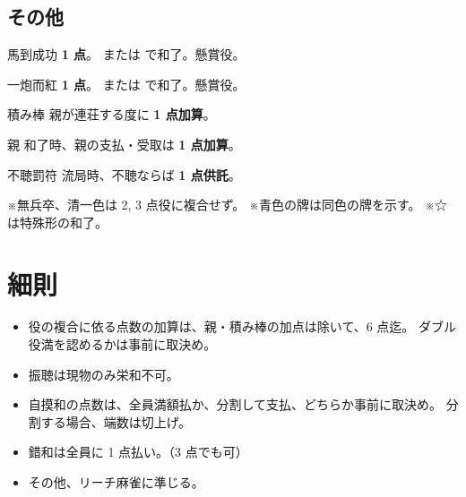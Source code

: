 \documentclass[line_length=50zw,head_space=2cm,foot_space=1cm]{jlreq}
\newcommand{\特殊}{\textsuperscript ☆}
\begin{document}
\begin{multicols}{2}
	\subsection*{その他}
	\begin{desc}
		\item[馬到成功] \textbf{1 点}。 または  で和了。懸賞役。
		\item[一炮而紅] \textbf{1 点}。 または  で和了。懸賞役。
		\item[積み棒] 親が連荘する度に \textbf{1 点加算}。
		\item[親] 和了時、親の支払・受取は \textbf{1 点加算}。
		\item[不聴罰符] 流局時、不聴ならば \textbf{1 点供託}。
	\end{desc}
\end{multicols}
※無兵卒、清一色は 2, 3 点役に複合せず。
※青色の牌は同色の牌を示す。
※☆は特殊形の和了。

\section{細則}
\begin{itemize}
	\item 役の複合に依る点数の加算は、親・積み棒の加点は除いて、6 点迄。
		ダブル役満を認めるかは事前に取決め。
	\item 振聴は現物のみ栄和不可。
	\item 自摸和の点数は、全員満額払か、分割して支払、どちらか事前に取決め。
		分割する場合、端数は切上げ。
	\item 錯和は全員に 1 点払い。（3 点でも可）
	\item その他、リーチ麻雀に準じる。
\end{itemize}
\end{document}
